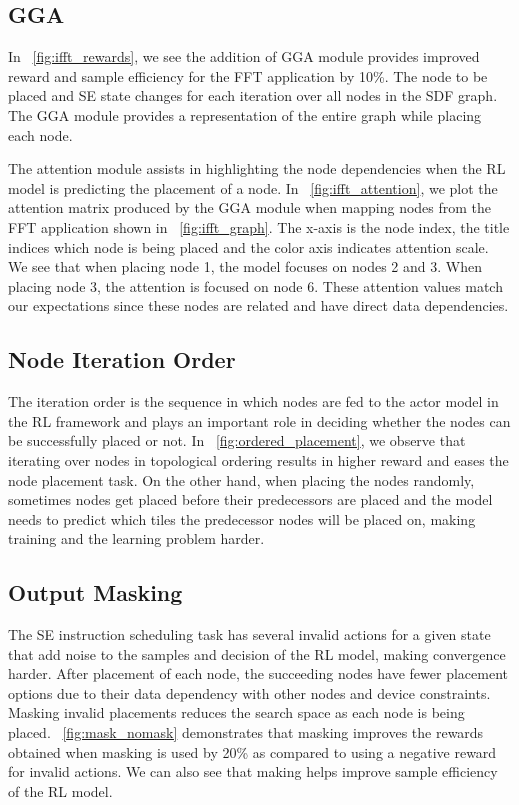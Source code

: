 \subsection{GGA} \label{sec:GGA_result}

In \figurename~\ref{fig:ifft_rewards}, we see the addition of GGA module provides improved reward and sample efficiency for the FFT application by 10\%. 
The node to be placed and SE state changes for each iteration over all nodes in the SDF graph. The GGA module provides a representation of the entire graph while placing each node.

The attention module assists in highlighting the node dependencies when the RL model is predicting the placement of a node. 
In \figurename~\ref{fig:ifft_attention}, we plot the attention matrix produced by the GGA module when mapping nodes from the FFT application shown in \figurename~\ref{fig:ifft_graph}. 
The x-axis is the node index, the title indices which node is being placed and the color axis indicates attention scale.
We see that when placing node 1, the model focuses on nodes 2 and 3. When placing node 3, the attention is focused on node 6. 
These attention values match our expectations since these nodes are related and have direct data dependencies. 

\subsection{Node Iteration Order}

The iteration order is the sequence in which nodes are fed to the actor model in the RL framework and plays an important role in deciding whether the nodes can be successfully placed or not. 
In \figurename~\ref{fig:ordered_placement}, we observe that iterating over nodes in topological ordering results in higher reward and eases the node placement task. 
On the other hand, when placing the nodes randomly, sometimes nodes get placed before their predecessors are placed and the model needs to predict which tiles the predecessor nodes will be placed on, making training and the learning problem harder.

\subsection{Output Masking}
\label{subsec:output_masking}
The SE instruction scheduling task has several invalid actions for a given state that add noise to the samples and decision of the RL model, making convergence harder. 
After placement of each node, the succeeding nodes have fewer placement options due to their data dependency with other nodes and device constraints.
Masking invalid placements reduces the search space as each node is being placed. 
\figurename~\ref{fig:mask_nomask} demonstrates that masking improves the rewards obtained when masking is used by 20\% as compared to using a negative reward for invalid actions. We can also see that making helps improve sample efficiency of the RL model.

